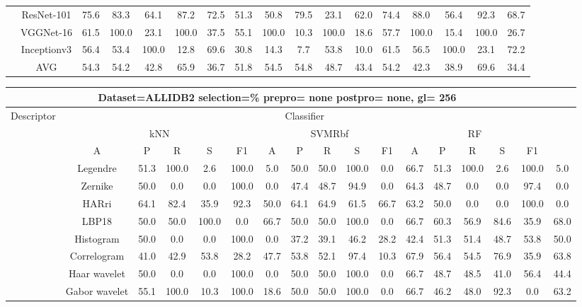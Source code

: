 \documentclass[12pt,italian]{article}
\begin{document}
\begin{tiny}
\begin{longtable}{lcccccccccccccccc}
& ResNet-101 & 75.6 & 83.3 & 64.1 & 87.2 & 72.5 & 51.3 & 50.8 & 79.5 & 23.1 & 62.0 & 74.4 & 88.0 & 56.4 & 92.3 & 68.7 \\ 
& VGGNet-16 & 61.5 & 100.0 & 23.1 & 100.0 & 37.5 & 55.1 & 100.0 & 10.3 & 100.0 & 18.6 & 57.7 & 100.0 & 15.4 & 100.0 & 26.7 \\ 
& Inceptionv3 & 56.4 & 53.4 & 100.0 & 12.8 & 69.6 & 30.8 & 14.3 &  7.7 & 53.8 & 10.0 & 61.5 & 56.5 & 100.0 & 23.1 & 72.2 \\ 
\hline
& AVG & 54.3 & 54.2 & 42.8 & 65.9 & 36.7 & 51.8 & 54.5 & 54.8 & 48.7 & 43.4 & 54.2 & 42.3 & 38.9 & 69.6 & 34.4 \\ 
\hline
\bottomrule
\end{longtable} 

 \pagebreak 
\begin{longtable}{lcccccccccccccccc}
\toprule
\multicolumn{16}{c}{Dataset=ALLIDB2 selection=\% prepro= none postpro= none, gl= 256} \\ 
\toprule
Descriptor & \multicolumn{15}{c}{Classifier} \\ 
& \multicolumn{5}{c}{kNN} & \multicolumn{5}{c}{SVMRbf} & \multicolumn{5}{c}{RF} \\ 
& A & P & R & S & F1 & A & P & R & S & F1 & A & P & R & S & F1 \\ 
\midrule
& Legendre & 51.3 & 100.0 &  2.6 & 100.0 &  5.0 & 50.0 & 50.0 & 100.0 &  0.0 & 66.7 & 51.3 & 100.0 &  2.6 & 100.0 &  5.0 \\ 
& Zernike & 50.0 &  0.0 &  0.0 & 100.0 &  0.0 & 47.4 & 48.7 & 94.9 &  0.0 & 64.3 & 48.7 &  0.0 &  0.0 & 97.4 &  0.0 \\ 
& HARri & 64.1 & 82.4 & 35.9 & 92.3 & 50.0 & 64.1 & 64.9 & 61.5 & 66.7 & 63.2 & 50.0 &  0.0 &  0.0 & 100.0 &  0.0 \\ 
& LBP18 & 50.0 & 50.0 & 100.0 &  0.0 & 66.7 & 50.0 & 50.0 & 100.0 &  0.0 & 66.7 & 60.3 & 56.9 & 84.6 & 35.9 & 68.0 \\ 
& Histogram & 50.0 &  0.0 &  0.0 & 100.0 &  0.0 & 37.2 & 39.1 & 46.2 & 28.2 & 42.4 & 51.3 & 51.4 & 48.7 & 53.8 & 50.0 \\ 
& Correlogram & 41.0 & 42.9 & 53.8 & 28.2 & 47.7 & 53.8 & 52.1 & 97.4 & 10.3 & 67.9 & 56.4 & 54.5 & 76.9 & 35.9 & 63.8 \\ 
& Haar wavelet & 50.0 &  0.0 &  0.0 & 100.0 &  0.0 & 50.0 & 50.0 & 100.0 &  0.0 & 66.7 & 48.7 & 48.5 & 41.0 & 56.4 & 44.4 \\ 
& Gabor wavelet & 55.1 & 100.0 & 10.3 & 100.0 & 18.6 & 50.0 & 50.0 & 100.0 &  0.0 & 66.7 & 46.2 & 48.0 & 92.3 &  0.0 & 63.2 \\ 

\end{longtable}
\end{tiny}
\end{document}
